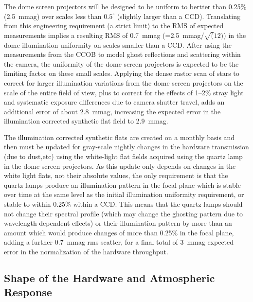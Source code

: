 \documentclass[12pt,preprint]{aastex}
\begin{document}
The dome screen projectors will be designed to be uniform to bertter than
0.25\% (2.5~mmag) over scales less than $0.5^{\circ}$ (slightly larger
than a CCD). Translating from this engineering requirement (a strict
limit) to the RMS of expected measurements implies a resulting RMS of
0.7~mmag (=2.5~mmag/$\sqrt(12)$) in the dome illumination uniformity
on scales smaller than a CCD. After using the measurements from the
CCOB to model ghost reflections and scattering within the camera, the
uniformity of the dome screen projectors is expected to be the
limiting factor on these small scales. Applying the dense rastor scan
of stars to correct for larger illumination variations from the dome
screen projectors on the scale of the entire field of view, plus to
correct for the effects of 1--2\% stray light and systematic exposure
differences due to camera shutter travel, adds an additional error of
about 2.8~mmag, increasing the expected error in the illumination
corrected synthetic flat field to 2.9~mmag.

The illumination corrected synthetic flats are created on a monthly
basis and then must be updated for gray-scale nightly changes in the
hardware transmission (due to dust,etc) using the white-light flat
fields acquired using the quartz lamp in the dome screen
projectors. As this update only depends on changes in the white light
flats, not their absolute values, the only requirement is that the
quartz lamps produce an illumination pattern in the focal plane which
is stable over time at the same level as the initial illumination
uniformity requirement, or stable to within 0.25\% within a CCD. This
means that the quartz lamps should not change their spectral profile
(which may change the ghosting pattern due to wavelength dependent
effects) or their illumination pattern by more than an amount which
would produce changes of more than 0.25\% in the focal plane, adding a
further 0.7~mmag rms scatter, for a final total of 3~mmag expected
error in the normalization of the hardware throughput.

\subsection{Shape of the Hardware and Atmospheric Response}
\label{sec:phi_correction}
\end{document}
